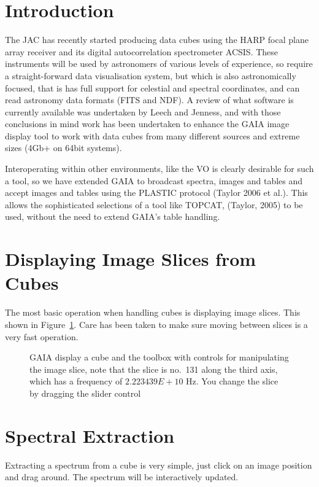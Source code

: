 \documentclass[11pt,twoside]{article}  %
\begin{document}
\section{Introduction}

The JAC has recently started producing data cubes using the HARP focal plane
array receiver and its digital autocorrelation spectrometer ACSIS. These
instruments will be used by astronomers of various levels of experience, so
require a straight-forward data visualisation system, but which is also
astronomically focused, that is has full support for celestial and spectral
coordinates, and can read astronomy data formats (FITS and NDF). A review of
what software is currently available was undertaken by Leech and Jenness, and
with those conclusions in mind work has been undertaken to enhance the GAIA
image display tool to work with data cubes from many different sources and
extreme sizes (4Gb+ on 64bit systems).

Interoperating within other environments, like the VO is clearly desirable for
such a tool, so we have extended GAIA to broadcast spectra, images and tables
and accept images and tables using the PLASTIC protocol (Taylor 2006 et al.).
This allows the sophisticated selections of a tool like TOPCAT, (Taylor, 2005)
to be used, without the need to extend GAIA's table handling.

\section{Displaying Image Slices from Cubes}

The most basic operation when handling cubes is displaying image slices. This
shown in Figure~\ref{D1.1-fig1}. Care has been taken to make sure moving
between slices is a very fast operation.

\begin{figure}
\caption{GAIA display a cube and the toolbox with controls for manipulating
the image slice, note that the slice is no.\ 131 along the third axis, which
has a frequency of $2.223439E+10$ Hz. You change the slice by dragging the
slider control}
\label{D1.1-fig1}
\end{figure}

\section{Spectral Extraction}

Extracting a spectrum from a cube is very simple, just click on an image
position and drag around. The spectrum will be interactively updated.
\end{document}
